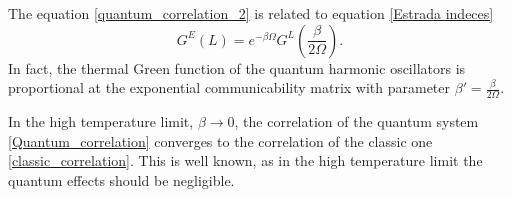 The equation \eqref{quantum_correlation_2} is related to equation \eqref{Estrada indeces}
\begin{equation}
    G^E(L) = e^{-\beta\Omega}G^L\left(\frac{\beta}{2\Omega}\right).
\end{equation} 
In fact, the thermal Green function of the quantum harmonic oscillators is proportional at the exponential communicability matrix with parameter $\beta' = \frac{\beta}{2\Omega}$.

In the high temperature limit, $\beta \rightarrow 0$, the correlation of the quantum system \eqref{Quantum_correlation} converges to the correlation of the classic one \eqref{classic_correlation}. This is well known, as in the high temperature limit the quantum effects should be negligible.
